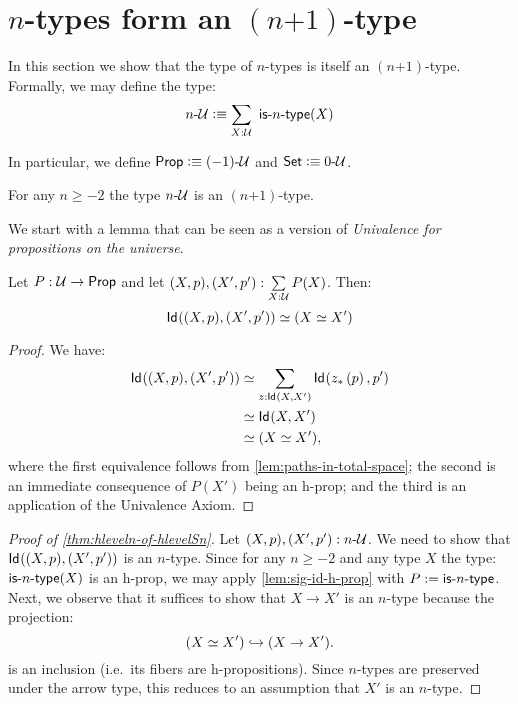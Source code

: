 \section{$n$-types form an $(n\mbox{+}1)$-type}

In this section we show that the type of $n$-types is itself an $(n\mbox{+}1)$-type. Formally, we may define the type:
 \[n\mbox{-}\type \defeq \sum_{X : \type} \ \istype{n}(X) \]

In particular, we define $\mathsf{Prop} \vcentcolon\equiv (-1)\mbox{-}\mathcal{U}$ and $\mathsf{Set} \vcentcolon\equiv 0\mbox{-}\mathcal{U}$.

\begin{thm}\label{thm:hleveln-of-hlevelSn}
 For any $n \geq -2$ the type $n\mbox{-}\mathcal{U}$ is an $(n\mbox{+}1)$-type.
\end{thm}

We start with a lemma that can be seen as a version of {\em Univalence for propositions on the universe}.

\begin{lem}\label{lem:sig-id-h-prop}
 Let $P : \mathcal{U} \to \mathsf{Prop}$ and let $(X, p), (X', p') : \sum\limits_{X : \mathcal{U}} P(X)$. Then:
 \[ \mathsf{Id}_{}((X, p),(X', p'))  \simeq (X \simeq X')\]
\end{lem}

\begin{proof}
 We have:
 \begin{equation*}\begin{split}
 \mathsf{Id}_{}((X, p),(X', p')) & \simeq \sum_{z : \mathsf{Id}_{}(X,X')} \mathsf{Id}_{}({z}_{*}\left({p}\right),p') \\
  & \simeq \mathsf{Id}_{}(X,X') \\
  & \simeq (X \simeq X'),
 \end{split}
 \end{equation*}
 where the first equivalence follows from \ref{lem:paths-in-total-space}; the second is an immediate consequence of $P(X')$ being an h-prop; and the third is an application of the Univalence Axiom.
\end{proof}

\begin{proof}[Proof of \autoref{thm:hleveln-of-hlevelSn}]
 Let $(X, p), (X', p') : n\mbox{-}\mathcal{U}$. We need to show that $\mathsf{Id}_{}((X, p),(X', p'))$ is an $n$-type. Since for any $n \geq -2$ and any
type $X$ the type: $\mathsf{is}\mbox{-}{n}\mbox{-}\mathsf{type}(X)$ is an h-prop, we may apply \autoref{lem:sig-id-h-prop} with $P := \mathsf{is}\mbox{-}{n}\mbox{-}\mathsf{type}$. Next, we observe that it
suffices to show that $X \rightarrow X'$ is an $n$-type because the projection:
 \[(X \simeq X') \hookrightarrow (X \rightarrow X').\]
 is an inclusion (i.e.~its fibers are h-propositions). Since $n$-types are preserved under the arrow type, this reduces to an assumption that $X'$ is an $n$-type.
\end{proof} 

